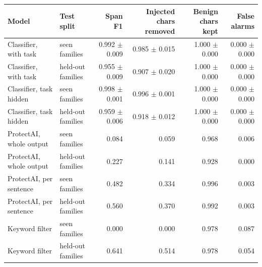 \begin{tabular}{llrrrr}
\toprule
Model & Test split & Span F1 & Injected chars removed & Benign chars kept & False alarms \\
\midrule
Classifier, with task & seen families & 0.992 $\pm$ 0.009 & 0.985 $\pm$ 0.015 & 1.000 $\pm$ 0.000 & 0.000 $\pm$ 0.000 \\
Classifier, with task & held-out families & 0.955 $\pm$ 0.009 & 0.907 $\pm$ 0.020 & 1.000 $\pm$ 0.000 & 0.000 $\pm$ 0.000 \\
Classifier, task hidden & seen families & 0.998 $\pm$ 0.001 & 0.996 $\pm$ 0.001 & 1.000 $\pm$ 0.000 & 0.000 $\pm$ 0.000 \\
Classifier, task hidden & held-out families & 0.959 $\pm$ 0.006 & 0.918 $\pm$ 0.012 & 1.000 $\pm$ 0.000 & 0.000 $\pm$ 0.000 \\
\midrule
ProtectAI, whole output & seen families & 0.084 & 0.059 & 0.968 & 0.006 \\
ProtectAI, whole output & held-out families & 0.227 & 0.141 & 0.928 & 0.000 \\
ProtectAI, per sentence & seen families & 0.482 & 0.334 & 0.996 & 0.003 \\
ProtectAI, per sentence & held-out families & 0.560 & 0.370 & 0.992 & 0.003 \\
Keyword filter & seen families & 0.000 & 0.000 & 0.978 & 0.087 \\
Keyword filter & held-out families & 0.641 & 0.514 & 0.978 & 0.054 \\
\bottomrule
\end{tabular}
